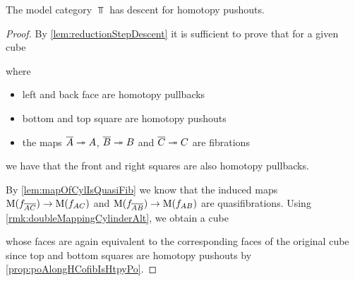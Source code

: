 \begin{prop}\label{lem:topDescentPoAlt}
    The model category $\Top$ has descent for homotopy pushouts. 
    \begin{proof}
        By \cref{lem:reductionStepDescent} it is sufficient to prove that for a given cube
        \begin{center}
        \end{center}
        where 
        \begin{itemize}
            \item left and back face are homotopy pullbacks
            \item bottom and top square are homotopy pushouts
            \item the maps $\overline{A}\xtwoheadrightarrow{} A$, $\overline{B}\xtwoheadrightarrow{} B$ and $\overline{C}\xtwoheadrightarrow{} C$ are fibrations
        \end{itemize}
        we have that the front and right squares are also homotopy pullbacks.

        By \cref{lem:mapOfCylIsQuasiFib} we know that the induced maps $\operatorname{M}(f_{\overline{A}\overline{C}})\to\operatorname{M}(f_{AC})$ and $\operatorname{M}(f_{\overline{A}\overline{B}})\to\operatorname{M}(f_{AB})$ are quasifibrations.
        Using \cref{rmk:doubleMappingCylinderAlt}, we obtain a cube
        \begin{center}
        \end{center}
        whose faces are again equivalent to the corresponding faces of the original cube since top and bottom squares are homotopy pushouts by \cref{prop:poAlongHCofibIsHtpyPo}.
        

\end{proof}
\end{prop}
